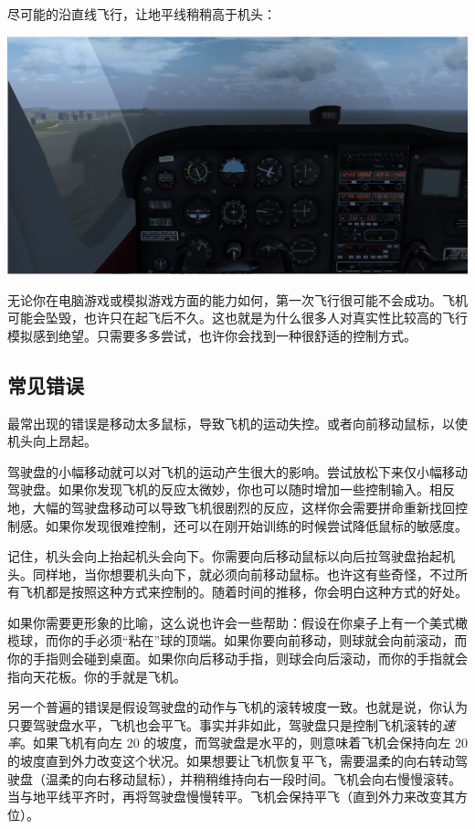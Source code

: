 尽可能的沿直线飞行，让地平线稍稍高于机头：
\medskip

\centerline{
  \includegraphics[width=\textwidth]{img/basic_tutorial/straight-level}
}
\medskip

无论你在电脑游戏或模拟游戏方面的能力如何，第一次飞行很可能不会成功。飞机可能会坠毁，也许只在起飞后不久。这也就是为什么很多人对真实性比较高的飞行模拟感到绝望。只需要多多尝试，也许你会找到一种很舒适的控制方式。

\subsection*{常见错误}

最常出现的错误是移动太多鼠标，导致飞机的运动失控。或者向前移动鼠标，以使机头向上昂起。
\medskip

驾驶盘的小幅移动就可以对飞机的运动产生很大的影响。尝试放松下来仅小幅移动驾驶盘。如果你发现飞机的反应太微妙，你也可以随时增加一些控制输入。相反地，大幅的驾驶盘移动可以导致飞机很剧烈的反应，这样你会需要拼命重新找回控制感。如果你发现很难控制，还可以在刚开始训练的时候尝试降低鼠标的敏感度。

记住，机头会向上抬起机头会向下。你需要向后移动鼠标以向后拉驾驶盘抬起机头。同样地，当你想要机头向下，就必须向前移动鼠标。也许这有些奇怪，不过所有飞机都是按照这种方式来控制的。随着时间的推移，你会明白这种方式的好处。

如果你需要更形象的比喻，这么说也许会一些帮助：假设在你桌子上有一个美式橄榄球，而你的手必须“粘在”球的顶端。如果你要向前移动，则球就会向前滚动，而你的手指则会碰到桌面。如果你向后移动手指，则球会向后滚动，而你的手指就会指向天花板。你的手就是飞机。

另一个普遍的错误是假设驾驶盘的动作与飞机的滚转坡度一致。也就是说，你认为只要驾驶盘水平，飞机也会平飞。事实并非如此，驾驶盘只是控制飞机滚转的\emph{速率}。如果飞机有向左 20\textdegree{} 的坡度，而驾驶盘是水平的，则意味着飞机会保持向左 20\textdegree{} 的坡度直到外力改变这个状况。如果想要让飞机恢复平飞，需要温柔的向右转动驾驶盘（温柔的向右移动鼠标），并稍稍维持向右一段时间。飞机会向右慢慢滚转。当与地平线平齐时，再将驾驶盘慢慢转平。飞机会保持平飞（直到外力来改变其方位）。

